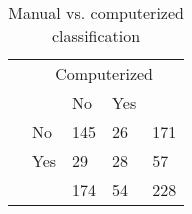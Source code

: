 \begin{table}
\begin{small}
\begin{threeparttable}
\caption{{\normalsize Manual vs. computerized classification}}
\begin{tabular}{ll|ll|l}
& \multicolumn{4}{c}{Computerized} \tabularnewline[0.1cm]
& & No & Yes &   \tabularnewline
\cline{2-5}
\parbox[t]{2mm}{} & No & 145 & 26 & 171 \tabularnewline
& Yes & 29 & 28 & 57 \tabularnewline
{}
&  & 174 & 54 & 228 \tabularnewline
\end{tabular}
\end{threeparttable}
\end{small}
\end{table}
